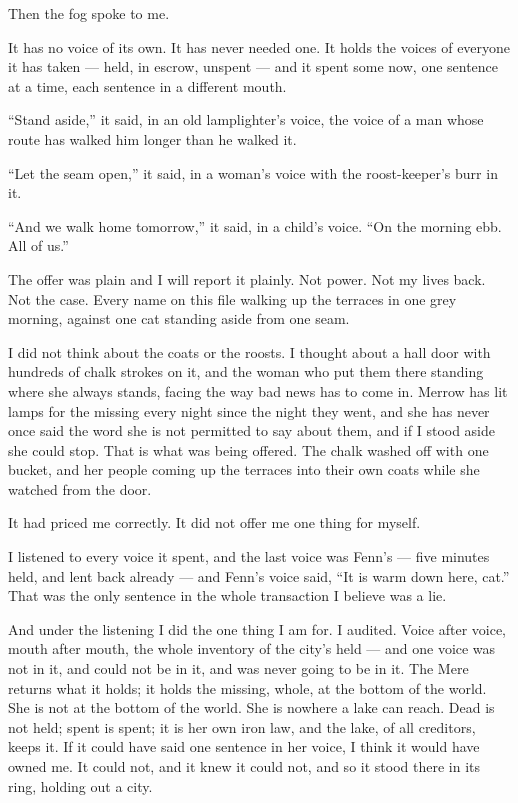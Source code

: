 Then the fog spoke to me.

It has no voice of its own. It has never needed one. It holds the voices of everyone it has taken --- held, in escrow, unspent --- and it spent some now, one sentence at a time, each sentence in a different mouth.

``Stand aside,'' it said, in an old lamplighter's voice, the voice of a man whose route has walked him longer than he walked it.

``Let the seam open,'' it said, in a woman's voice with the roost-keeper's burr in it.

``And we walk home tomorrow,'' it said, in a child's voice. ``On the morning ebb. All of us.''

The offer was plain and I will report it plainly. Not power. Not my lives back. Not the case. Every name on this file walking up the terraces in one grey morning, against one cat standing aside from one seam.

I did not think about the coats or the roosts. I thought about a hall door with hundreds of chalk strokes on it, and the woman who put them there standing where she always stands, facing the way bad news has to come in. Merrow has lit lamps for the missing every night since the night they went, and she has never once said the word she is not permitted to say about them, and if I stood aside she could stop. That is what was being offered. The chalk washed off with one bucket, and her people coming up the terraces into their own coats while she watched from the door.

It had priced me correctly. It did not offer me one thing for myself.

I listened to every voice it spent, and the last voice was Fenn's --- five minutes held, and lent back already --- and Fenn's voice said, ``It is warm down here, cat.'' That was the only sentence in the whole transaction I believe was a lie.

And under the listening I did the one thing I am for. I audited. Voice after voice, mouth after mouth, the whole inventory of the city's held --- and one voice was not in it, and could not be in it, and was never going to be in it. The Mere returns what it holds; it holds the missing, whole, at the bottom of the world. She is not at the bottom of the world. She is nowhere a lake can reach. Dead is not held; spent is spent; it is her own iron law, and the lake, of all creditors, keeps it. If it could have said one sentence in her voice, I think it would have owned me. It could not, and it knew it could not, and so it stood there in its ring, holding out a city.

